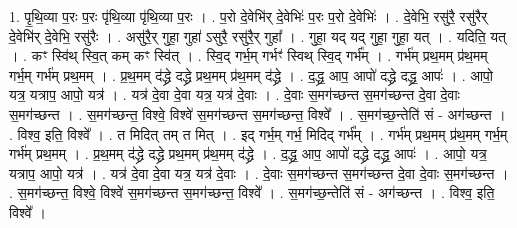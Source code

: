 \documentclass[17pt]{extarticle}
\begin{document}
1. पृ॒थि॒व्या प॒रः प॒रः पृ॑थि॒व्या पृ॑थि॒व्या प॒रः । . प॒रो दे॒वेभि॑र् दे॒वेभिः॑ प॒रः प॒रो दे॒वेभिः॑ । . दे॒वेभि॒ रसु॑रै॒ रसु॑रैर् दे॒वेभि॑र् दे॒वेभि॒ रसु॑रैः । . असु॑रै॒र् गुहा॒ गुहा॑ ऽसुरै॒ रसु॑रै॒र् गुहा᳚ । . गुहा॒ यद् यद् गुहा॒ गुहा॒ यत् । . यदिति॒ यत् । . कꣳ स्वि॑थ् स्वि॒त् कम् कꣳ स्वि॑त् । . स्वि॒द् गर्भ॒म् गर्भꣳ॑ स्विथ् स्वि॒द् गर्भ᳚म् । . गर्भ॑म् प्रथ॒मम् प्र॑थ॒मम् गर्भ॒म् गर्भ॑म् प्रथ॒मम् । . प्र॒थ॒मम् द॑द्ध्रे दद्ध्रे प्रथ॒मम् प्र॑थ॒मम् द॑द्ध्रे । . द॒द्ध्र॒ आप॒ आपो॑ दद्ध्रे दद्ध्र॒ आपः॑ । . आपो॒ यत्र॒ यत्राप॒ आपो॒ यत्र॑ । . यत्र॑ दे॒वा दे॒वा यत्र॒ यत्र॑ दे॒वाः । . दे॒वाः स॒मग॑च्छन्त स॒मग॑च्छन्त दे॒वा दे॒वाः स॒मग॑च्छन्त । . स॒मग॑च्छन्त॒ विश्वे॒ विश्वे॑ स॒मग॑च्छन्त स॒मग॑च्छन्त॒ विश्वे᳚ । . स॒मग॑च्छ॒न्तेति॑ सं - अग॑च्छन्त । . विश्व॒ इति॒ विश्वे᳚ । . त मिदित् तम् त मित् । . इद् गर्भ॒म् गर्भ॒ मिदिद् गर्भ᳚म् । . गर्भ॑म् प्रथ॒मम् प्र॑थ॒मम् गर्भ॒म् गर्भ॑म् प्रथ॒मम् । . प्र॒थ॒मम् द॑द्ध्रे दद्ध्रे प्रथ॒मम् प्र॑थ॒मम् द॑द्ध्रे । . द॒द्ध्र॒ आप॒ आपो॑ दद्ध्रे दद्ध्र॒ आपः॑ । . आपो॒ यत्र॒ यत्राप॒ आपो॒ यत्र॑ । . यत्र॑ दे॒वा दे॒वा यत्र॒ यत्र॑ दे॒वाः । . दे॒वाः स॒मग॑च्छन्त स॒मग॑च्छन्त दे॒वा दे॒वाः स॒मग॑च्छन्त । . स॒मग॑च्छन्त॒ विश्वे॒ विश्वे॑ स॒मग॑च्छन्त स॒मग॑च्छन्त॒ विश्वे᳚ । . स॒मग॑च्छ॒न्तेति॑ सं - अग॑च्छन्त । . विश्व॒ इति॒ विश्वे᳚ । \newline
\end{document}
